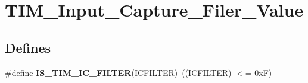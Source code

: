\hypertarget{group__TIM__Input__Capture__Filer__Value}{
\section{TIM\_\-Input\_\-Capture\_\-Filer\_\-Value}
\label{group__TIM__Input__Capture__Filer__Value}
}
\subsection*{Defines}
\begin{DoxyCompactItemize}
\item 
\hypertarget{group__TIM__Input__Capture__Filer__Value_ga19ecc5fc2e1ce1697c3dbbb9809ca243}{
\#define {\bfseries IS\_\-TIM\_\-IC\_\-FILTER}(ICFILTER)~((ICFILTER) $<$= 0xF)}
\label{group__TIM__Input__Capture__Filer__Value_ga19ecc5fc2e1ce1697c3dbbb9809ca243}

\end{DoxyCompactItemize}
